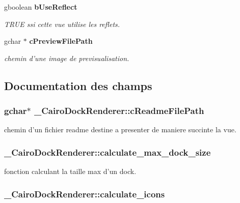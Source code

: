 \begin{CompactItemize}
gboolean {\bf bUseReflect}
\begin{CompactList}\small\item\em TRUE ssi cette vue utilise les reflets. \item\end{CompactList}\item 
gchar $\ast$ {\bf cPreviewFilePath}
\begin{CompactList}\small\item\em chemin d'une image de previsualisation. \item\end{CompactList}\end{CompactItemize}


\subsection{Documentation des champs}
\subsubsection{\setlength{\rightskip}{0pt plus 5cm}gchar$\ast$ {\bf \_\-CairoDockRenderer::cReadmeFilePath}}\label{struct__CairoDockRenderer_5ab5db64bd5a20186af903be07d2e5e4}


chemin d'un fichier readme destine a presenter de maniere succinte la vue. 

\subsubsection{ {\bf \_\-CairoDockRenderer::calculate\_\-max\_\-dock\_\-size}}\label{struct__CairoDockRenderer_32701b36d01c497f468a8d9d07a6655b}


fonction calculant la taille max d'un dock. 

\subsubsection{ {\bf \_\-CairoDockRenderer::calculate\_\-icons}}\label{struct__CairoDockRenderer_53aaac10d7fd62b4d05ff1198dfafbdb}


